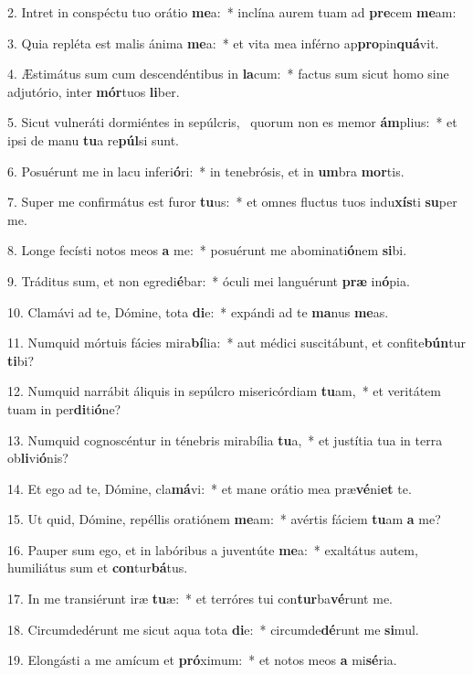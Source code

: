 2. Intret in conspéctu tuo orátio \textbf{me}a:~*  inclína aurem tuam ad \textbf{pre}cem \textbf{me}am:\

3. Quia repléta est malis ánima \textbf{me}a:~*  et vita mea inférno ap\textbf{pro}pin\textbf{quá}vit.\

4. Æstimátus sum cum descendéntibus in \textbf{la}cum:~*  factus sum sicut homo sine adjutório, inter \textbf{mór}tuos \textbf{li}ber.\

5. Sicut vulneráti dormiéntes in sepúlcris, \dag\  quorum non es memor \textbf{ám}plius:~*  et ipsi de manu \textbf{tu}a re\textbf{púl}si sunt.\

6. Posuérunt me in lacu inferi\textbf{ó}ri:~*  in tenebrósis, et in \textbf{um}bra \textbf{mor}tis.\

7. Super me confirmátus est furor \textbf{tu}us:~*  et omnes fluctus tuos indu\textbf{xís}ti \textbf{su}per me.\

8. Longe fecísti notos meos \textbf{a} me:~*  posuérunt me abominati\textbf{ó}nem \textbf{si}bi.\

9. Tráditus sum, et non egredi\textbf{é}bar:~*  óculi mei languérunt \textbf{præ} in\textbf{ó}pia.\

10. Clamávi ad te, Dómine, tota \textbf{di}e:~*  expándi ad te \textbf{ma}nus \textbf{me}as.\

11. Numquid mórtuis fácies mira\textbf{bí}lia:~*  aut médici suscitábunt, et confite\textbf{bún}tur \textbf{ti}bi?\

12. Numquid narrábit áliquis in sepúlcro misericórdiam \textbf{tu}am,~*  et veritátem tuam in per\textbf{di}ti\textbf{ó}ne?\

13. Numquid cognoscéntur in ténebris mirabília \textbf{tu}a,~*  et justítia tua in terra ob\textbf{li}vi\textbf{ó}nis?\

14. Et ego ad te, Dómine, cla\textbf{má}vi:~*  et mane orátio mea præ\textbf{vé}ni\textbf{et} te.\

15. Ut quid, Dómine, repéllis oratiónem \textbf{me}am:~*  avértis fáciem \textbf{tu}am \textbf{a} me?\

16. Pauper sum ego, et in labóribus a juventúte \textbf{me}a:~*  exaltátus autem, humiliátus sum et \textbf{con}tur\textbf{bá}tus.\

17. In me transiérunt iræ \textbf{tu}æ:~*  et terróres tui con\textbf{tur}ba\textbf{vé}runt me.\

18. Circumdedérunt me sicut aqua tota \textbf{di}e:~*  circumde\textbf{dé}runt me \textbf{si}mul.\

19. Elongásti a me amícum et \textbf{pró}ximum:~*  et notos meos \textbf{a} mi\textbf{sé}ria.\

